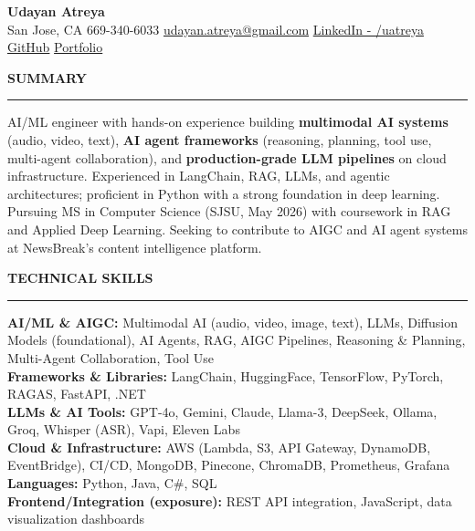 \documentclass[letterpaper,10.5pt]{extarticle}
\newcommand{\resumesection}[1]{%
    \vspace{6pt}%
    \noindent\textbf{#1}\vspace{-5pt}%
    \\\noindent\rule{\textwidth}{0.5pt}%
    \vspace{1pt}%
}
\begin{document}
\begin{center}
    {\LARGE\textbf{Udayan Atreya}}\\[3pt]
    {\fontsize{11}{13.2}\selectfont
    San Jose, CA \textbar{} 669-340-6033 \textbar{}
    \href{mailto:udayan.atreya@gmail.com}{udayan.atreya@gmail.com} \textbar{}
    \href{https://www.linkedin.com/in/uatreya/}{LinkedIn - /uatreya} \textbar{}
    \href{https://github.com/slowloris-98/}{GitHub} \textbar{}
    \href{https://udayan-atreya.vercel.app/}{Portfolio}}
\end{center}

\resumesection{SUMMARY}

\noindent AI/ML engineer with hands-on experience building \textbf{multimodal AI systems} (audio, video, text), \textbf{AI agent frameworks} (reasoning, planning, tool use, multi-agent collaboration), and \textbf{production-grade LLM pipelines} on cloud infrastructure. Experienced in LangChain, RAG, LLMs, and agentic architectures; proficient in Python with a strong foundation in deep learning. Pursuing MS in Computer Science (SJSU, May 2026) with coursework in RAG and Applied Deep Learning. Seeking to contribute to AIGC and AI agent systems at NewsBreak's content intelligence platform.

\resumesection{TECHNICAL SKILLS}

\noindent\textbf{AI/ML \& AIGC:} Multimodal AI (audio, video, image, text), LLMs, Diffusion Models (foundational), AI Agents, RAG, AIGC Pipelines, Reasoning \& Planning, Multi-Agent Collaboration, Tool Use\\
\noindent\textbf{Frameworks \& Libraries:} LangChain, HuggingFace, TensorFlow, PyTorch, RAGAS, FastAPI, .NET\\
\noindent\textbf{LLMs \& AI Tools:} GPT-4o, Gemini, Claude, Llama-3, DeepSeek, Ollama, Groq, Whisper (ASR), Vapi, Eleven Labs\\
\noindent\textbf{Cloud \& Infrastructure:} AWS (Lambda, S3, API Gateway, DynamoDB, EventBridge), CI/CD, MongoDB, Pinecone, ChromaDB, Prometheus, Grafana\\
\noindent\textbf{Languages:} Python, Java, C\#, SQL\\
\noindent\textbf{Frontend/Integration (exposure):} REST API integration, JavaScript, data visualization dashboards
\end{document}
